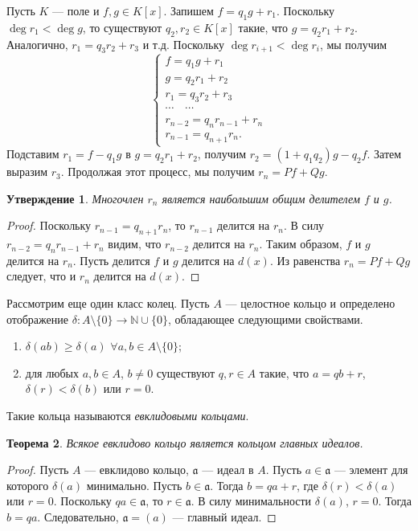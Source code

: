 \documentclass[12pt, titlepage, oneside]{amsbook}
\newcommand{\NN}{\mathbb{N}}
\newcommand{\aaa}{\mathfrak{a}}
\newtheorem{theorem}{Теорема}[chapter]
\newtheorem{claim}[theorem]{Утверждение}
\theoremstyle{definition}
\theoremstyle{remark}
\begin{document}
Пусть $K$ --- поле и $f,g\in K[x]$. Запишем $f=q_1g+r_1$. Поскольку $\deg r_1<\deg g$, то существуют $q_2,r_2\in K[x]$ такие, что $g=q_2r_1+r_2$. Аналогично, $r_1=q_3r_2+r_3$ и т.д. Поскольку $\deg r_{i+1}<\deg r_i$, мы получим $$\begin{cases}f=q_1g+r_1             \\
		g=q_2r_1+r_2           \\
		r_1=q_3r_2+r_3         \\
		\cdots\quad\cdots      \\
		r_{n-2}=q_nr_{n-1}+r_n \\
		r_{n-1}=q_{n+1}r_n.\end{cases}$$ Подставим $r_{1}=f-q_1g$ в $g=q_2r_1+r_2$, получим $r_{2}=(1+q_1q_2)g-q_2f$. Затем выразим $r_3$. Продолжая этот процесс, мы получим $r_n=Pf+Qg$.

\begin{claim}
	\label{Mnog5} Многочлен $r_n$ является наибольшим общим делителем $f$ и $g$.
\end{claim}

\begin{proof}
	Поскольку $r_{n-1}=q_{n+1}r_n$, то $r_{n-1}$ делится на $r_n$. В силу $r_{n-2}=q_nr_{n-1}+r_n$ видим, что $r_{n-2}$ делится на $r_n$. Таким образом, $f$ и $g$ делится на $r_n$. Пусть делится $f$ и $g$ делится на $d(x)$. Из равенства $r_n=Pf+Qg$ следует, что и $r_n$ делится на $d(x)$.
\end{proof}

Рассмотрим еще один класс колец. Пусть $A$ --- целостное кольцо и определено отображение $\delta\colon A\setminus\{0\}\rightarrow\NN\cup\{0\}$, обладающее следующими свойствами. \begin{enumerate}
	\item $\delta(ab)\geq\delta(a)$ $\forall a,b\in A\setminus\{0\}$;
	\item для любых $a,b\in A$, $b\neq 0$ существуют $q,r\in A$ такие, что $a=qb+r$, $\delta(r)<\delta(b)$ или $r=0$.
\end{enumerate}
Такие кольца называются \emph{евклидовыми кольцами}.

\begin{theorem}
	\label{Mnog6} Всякое евклидово кольцо является кольцом главных идеалов.
\end{theorem}

\begin{proof}
	Пусть $A$ --- евклидово кольцо, $\aaa$ --- идеал в $A$. Пусть $a\in\aaa$ --- элемент для которого $\delta(a)$ минимально. Пусть $b\in\aaa$. Тогда $b=qa+r$, где $\delta(r)<\delta(a)$ или $r=0$. Поскольку $qa\in\aaa$, то $r\in\aaa$. В силу минимальности $\delta(a)$, $r=0$. Тогда $b=qa$. Следовательно, $\aaa=(a)$ --- главный идеал.
\end{proof}
\end{document}
